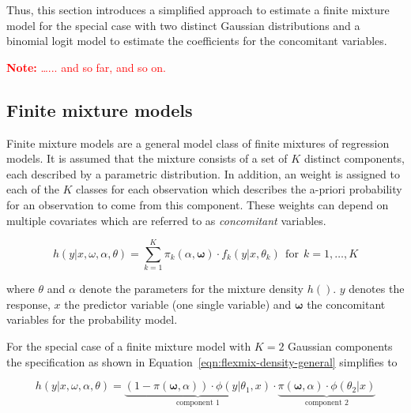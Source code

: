 \documentclass[article,nojss,shortnames]{jss}
\newcommand{\note}[1]{\textcolor{red}{\textbf{Note:} #1}}
\begin{document}
Thus, this section introduces a simplified approach to estimate 
a finite mixture model for the special case with two distinct
Gaussian distributions and a binomial logit model to estimate
the coefficients for the concomitant variables.

\note{\dots ... and so far, and so on.}

\subsection{Finite mixture models}

Finite mixture models are a general model class of finite
mixtures of regression models. It is assumed that the mixture
consists of a set of $K$ distinct components, each described by
a parametric distribution.
In addition, an weight is assigned to each of the $K$ classes
for each observation which describes the a-priori probability
for an observation to come from this component.
These weights can depend on multiple covariates which are
referred to as \textit{concomitant} variables.

\begin{equation}
    h(\mathit{y} | \mathit{x}, \mathit{\omega}, \mathit{\alpha}, \mathit{\theta}) =
        \sum_{k=1}^K \pi_k(\mathit{\alpha}, \mathbf{\omega}) \cdot f_k(\mathit{y} | \mathit{x}, \mathit{\theta}_k)
        ~~\text{for}~~k=1,\dots,K
    \label{eqn:flexmix-density-general}
\end{equation}

where $\mathit{\theta}$ and $\mathit{\alpha}$ denote the parameters for the
mixture density $h()$. $\mathit{y}$ denotes the response, $\mathit{x}$ the
predictor variable (one single variable) and $\mathbf{\omega}$ the concomitant
variables for the probability model.

For the special case of a finite mixture model with $K=2$ Gaussian components
the specification as shown in Equation~\ref{eqn:flexmix-density-general} simplifies to

\begin{equation}
    h(\mathit{y} | \mathit{x}, \mathit{\omega}, \mathit{\alpha}, \mathit{\theta}) =
        \underbrace{
            (1 - \mathit{\pi}(\mathbf{\omega}, \mathit{\alpha})) \cdot
            \phi(\mathit{y} | \mathit{\theta}_1, \mathit{x})
        }_{\text{component 1}}
        \cdot
        \underbrace{
            \mathit{\pi}(\mathbf{\omega}, \mathit{\alpha}) \cdot \phi(\mathit{\theta}_2|\mathit{x})
        }_{\text{component 2}}
    \label{eqn:flexmix-density-gaussian}
\end{equation}
\end{document}
